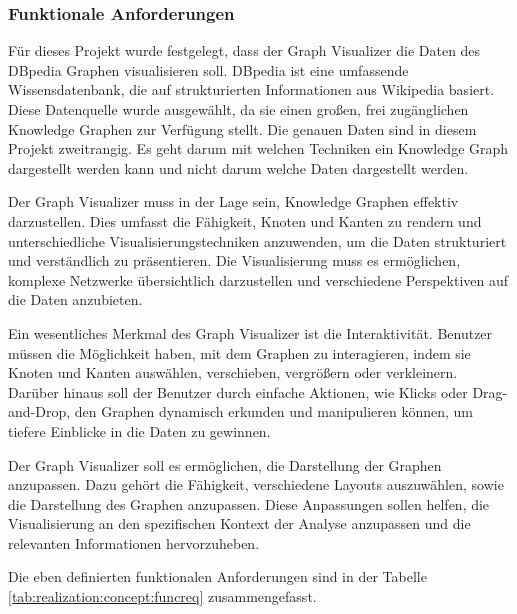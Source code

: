 \subsubsection{Funktionale Anforderungen}

Für dieses Projekt wurde festgelegt, dass der Graph Visualizer die Daten des DBpedia Graphen visualisieren soll. DBpedia ist eine umfassende Wissensdatenbank, die auf strukturierten Informationen aus Wikipedia basiert. Diese Datenquelle wurde ausgewählt, da sie einen großen, frei zugänglichen Knowledge Graphen zur Verfügung stellt. Die genauen Daten sind in diesem Projekt zweitrangig. Es geht darum mit welchen Techniken ein Knowledge Graph dargestellt werden kann und nicht darum welche Daten dargestellt werden.

Der Graph Visualizer muss in der Lage sein, Knowledge Graphen effektiv darzustellen. Dies umfasst die Fähigkeit, Knoten und Kanten zu rendern und unterschiedliche Visualisierungstechniken anzuwenden, um die Daten strukturiert und verständlich zu präsentieren. Die Visualisierung muss es ermöglichen, komplexe Netzwerke übersichtlich darzustellen und verschiedene Perspektiven auf die Daten anzubieten.

Ein wesentliches Merkmal des Graph Visualizer ist die Interaktivität. Benutzer müssen die Möglichkeit haben, mit dem Graphen zu interagieren, indem sie Knoten und Kanten auswählen, verschieben, vergrößern oder verkleinern. Darüber hinaus soll der Benutzer durch einfache Aktionen, wie Klicks oder Drag-and-Drop, den Graphen dynamisch erkunden und manipulieren können, um tiefere Einblicke in die Daten zu gewinnen.

Der Graph Visualizer soll es ermöglichen, die Darstellung der Graphen anzupassen. Dazu gehört die Fähigkeit, verschiedene Layouts auszuwählen, sowie die Darstellung des Graphen anzupassen. Diese Anpassungen sollen helfen, die Visualisierung an den spezifischen Kontext der Analyse anzupassen und die relevanten Informationen hervorzuheben.

Die eben definierten funktionalen Anforderungen sind in der Tabelle \ref{tab:realization:concept:funcreq} zusammengefasst.

